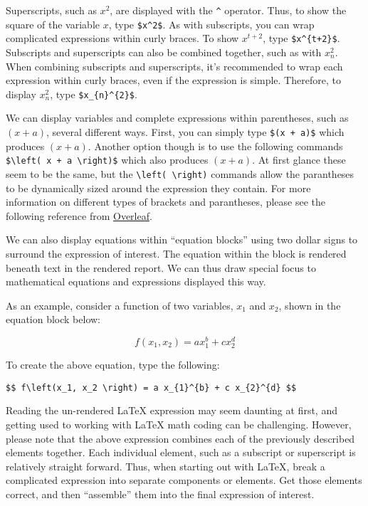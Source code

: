 \documentclass[]{article}
\begin{document}
Superscripts, such as \(x^2\), are displayed with the \texttt{\^{}}
operator. Thus, to show the square of the variable \(x\), type
\texttt{\$x\^{}2\$}. As with subscripts, you can wrap complicated
expressions within curly braces. To show \(x^{t+2}\), type
\texttt{\$x\^{}\{t+2\}\$}. Subscripts and superscripts can also be
combined together, such as with \(x_{n}^{2}\). When combining subscripts
and superscripts, it's recommended to wrap each expression within curly
braces, even if the expression is simple. Therefore, to display
\(x_{n}^{2}\), type \texttt{\$x\_\{n\}\^{}\{2\}\$}.

We can display variables and complete expressions within parentheses,
such as \(\left(x+a\right)\), several different ways. First, you can
simply type \texttt{\$(x\ +\ a)\$} which produces \((x + a)\). Another
option though is to use the following commands
\texttt{\$\textbackslash{}left(\ x\ +\ a\ \textbackslash{}right)\$}
which also produces \(\left( x + a \right)\). At first glance these seem
to be the same, but the
\texttt{\textbackslash{}left(\ \textbackslash{}right)} commands allow
the parantheses to be dynamically sized around the expression they
contain. For more information on different types of brackets and
parantheses, please see the following reference from
\href{https://www.overleaf.com/learn/latex/Brackets_and_Parentheses}{Overleaf}.

We can also display equations within ``equation blocks'' using two
dollar signs to surround the expression of interest. The equation within
the block is rendered beneath text in the rendered report. We can thus
draw special focus to mathematical equations and expressions displayed
this way.

As an example, consider a function of two variables, \(x_1\) and
\(x_2\), shown in the equation block below:

\[ 
f\left(x_1, x_2 \right) = a x_{1}^{b} + c x_{2}^{d}
\]

To create the above equation, type the following:

\texttt{\$\$\ f\textbackslash{}left(x\_1,\ x\_2\ \textbackslash{}right)\ =\ a\ x\_\{1\}\^{}\{b\}\ +\ c\ x\_\{2\}\^{}\{d\}\ \$\$}

Reading the un-rendered LaTeX expression may seem daunting at first, and
getting used to working with LaTeX math coding can be challenging.
However, please note that the above expression combines each of the
previously described elements together. Each individual element, such as
a subscript or superscript is relatively straight forward. Thus, when
starting out with LaTeX, break a complicated expression into separate
components or elements. Get those elements correct, and then
``assemble'' them into the final expression of interest.
\end{document}
